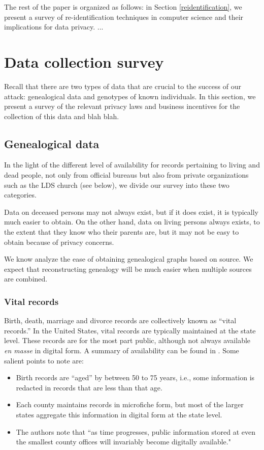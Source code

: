 \documentclass{article}
\begin{document}
The rest of the paper is organized as follows: in Section \ref{reidentification}, we present a survey of re-identification techniques in computer science and their implications for data privacy. ...




\section{Data collection survey}

Recall that there are two types of data that are crucial to the success of our attack: genealogical data and  genotypes of known individuals. In this section, we present a survey of the relevant privacy laws and business incentives for the collection of this data and blah blah.


\subsection{Genealogical data}
In the light of the different level of availability for records pertaining to living and dead people, not only from official bureaus but also from private organizations such as the LDS church (see below), we divide our survey into these two categories.

Data on deceased persons may not always exist, but if it does exist, it is typically much easier to obtain. On the other hand, data on living persons always exists, to the extent that they know who their parents are, but it may not be easy to obtain because of privacy concerns.

We know analyze the ease of obtaining genealogical graphs based on source.
We expect that reconstructing genealogy will be much easier when multiple sources are combined.

\subsubsection{Vital records}

Birth, death, marriage  and divorce records are collectively known as ``vital records.'' In the United States, vital records are typically maintained at the state level. These records are for the most part public, although not always available {\em en masse} in digital form. A summary of availability can be found in \cite{messing}. Some salient points to note are:
\begin{itemize}
\item
Birth records are ``aged'' by between 50 to 75 years, i.e., some information is redacted in records that are less than that age.
\item
Each county maintains records in microfiche form, but most of the larger states aggregate this information in digital form at the state level. 
\item
The authors note that ``as time progresses, public information stored at even the smallest county offices will invariably become digitally available."
\end{itemize}
\end{document}

